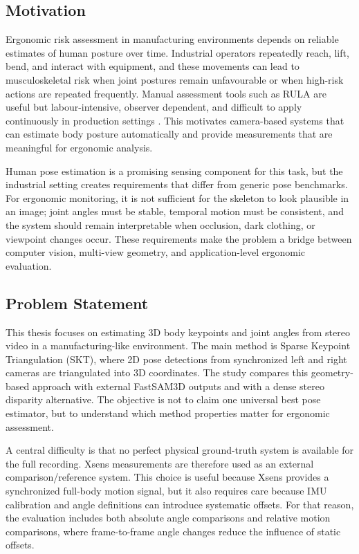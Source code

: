 \documentclass[12pt,a4paper]{article}
\begin{document}
\subsection{Motivation}

Ergonomic risk assessment in manufacturing environments depends on reliable
estimates of human posture over time.
Industrial operators repeatedly reach, lift, bend, and interact with equipment,
and these movements can lead to musculoskeletal risk when joint postures remain
unfavourable or when high-risk actions are repeated frequently.
Manual assessment tools such as RULA are useful but labour-intensive, observer
dependent, and difficult to apply continuously in production settings
\cite{mcatamney1993rula}.
This motivates camera-based systems that can estimate body posture
automatically and provide measurements that are meaningful for ergonomic
analysis.

Human pose estimation is a promising sensing component for this task, but the
industrial setting creates requirements that differ from generic pose
benchmarks.
For ergonomic monitoring, it is not sufficient for the skeleton to look
plausible in an image; joint angles must be stable, temporal motion must be
consistent, and the system should remain interpretable when occlusion, dark
clothing, or viewpoint changes occur.
These requirements make the problem a bridge between computer vision,
multi-view geometry, and application-level ergonomic evaluation.

\subsection{Problem Statement}

This thesis focuses on estimating 3D body keypoints and joint angles from
stereo video in a manufacturing-like environment.
The main method is Sparse Keypoint Triangulation (SKT), where 2D pose detections
from synchronized left and right cameras are triangulated into 3D coordinates.
The study compares this geometry-based approach with external FastSAM3D outputs
and with a dense stereo disparity alternative.
The objective is not to claim one universal best pose estimator, but to
understand which method properties matter for ergonomic assessment.

A central difficulty is that no perfect physical ground-truth system is
available for the full recording.
Xsens measurements are therefore used as an external comparison/reference
system.
This choice is useful because Xsens provides a synchronized full-body motion
signal, but it also requires care because IMU calibration and angle definitions
can introduce systematic offsets.
For that reason, the evaluation includes both absolute angle comparisons and
relative motion comparisons, where frame-to-frame angle changes reduce the
influence of static offsets.
\end{document}

